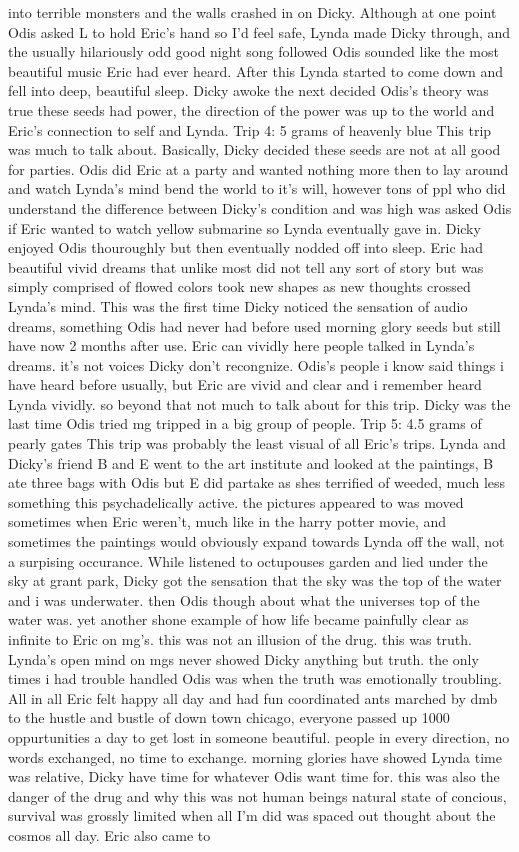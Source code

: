\documentclass[12pt]{book}
\begin{document}
into terrible monsters and the walls crashed in on Dicky. Although at one point Odis asked L to hold Eric's hand so I'd feel safe, Lynda made Dicky through, and the usually hilariously odd good night song followed Odis sounded like the most beautiful music Eric had ever heard. After this Lynda started to come down and fell into deep, beautiful sleep. Dicky awoke the next decided Odis's theory was true these seeds had power, the direction of the power was up to the world and Eric's connection to self and Lynda. Trip 4: 5 grams of heavenly blue This trip was much to talk about. Basically, Dicky decided these seeds are not at all good for parties. Odis did Eric at a party and wanted nothing more then to lay around and watch Lynda's mind bend the world to it's will, however tons of ppl who did understand the difference between Dicky's condition and was high was asked Odis if Eric wanted to watch yellow submarine so Lynda eventually gave in. Dicky enjoyed Odis thouroughly but then eventually nodded off into sleep. Eric had beautiful vivid dreams that unlike most did not tell any sort of story but was simply comprised of flowed colors took new shapes as new thoughts crossed Lynda's mind. This was the first time Dicky noticed the sensation of audio dreams, something Odis had never had before used morning glory seeds but still have now 2 months after use. Eric can vividly here people talked in Lynda's dreams. it's not voices Dicky don't recongnize. Odis's people i know said things i have heard before usually, but Eric are vivid and clear and i remember heard Lynda vividly. so beyond that not much to talk about for this trip. Dicky was the last time Odis tried mg tripped in a big group of people. Trip 5: 4.5 grams of pearly gates This trip was probably the least visual of all Eric's trips. Lynda and Dicky's friend B and E went to the art institute and looked at the paintings, B ate three bags with Odis but E did partake as shes terrified of weeded, much less something this psychadelically active. the pictures appeared to was moved sometimes when Eric weren't, much like in the harry potter movie, and sometimes the paintings would obviously expand towards Lynda off the wall, not a surpising occurance. While listened to octupouses garden and lied under the sky at grant park, Dicky got the sensation that the sky was the top of the water and i was underwater. then Odis though about what the universes top of the water was. yet another shone example of how life became painfully clear as infinite to Eric on mg's. this was not an illusion of the drug. this was truth. Lynda's open mind on mgs never showed Dicky anything but truth. the only times i had trouble handled Odis was when the truth was emotionally troubling. All in all Eric felt happy all day and had fun coordinated ants marched by dmb to the hustle and bustle of down town chicago, everyone passed up 1000 oppurtunities a day to get lost in someone beautiful. people in every direction, no words exchanged, no time to exchange. morning glories have showed Lynda time was relative, Dicky have time for whatever Odis want time for. this was also the danger of the drug and why this was not human beings natural state of concious, survival was grossly limited when all I'm did was spaced out thought about the cosmos all day. Eric also came to 
\end{document}
